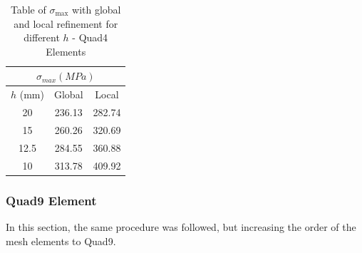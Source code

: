 \begin{table}[H]
  \centering
\caption{Table of $\sigma_{\max}$ with global and local refinement for different $h$ - Quad4 Elements}
  \begin{tabular}{|c|c|c|}
    \hline
    \multicolumn{3}{|c|}{$\sigma_{max} (MPa)$} \\ \hline
    $h$ (mm) & Global & Local \\ \hline
    20 & 236.13 & 282.74 \\ \hline
    15 & 260.26 & 320.69 \\ \hline
    12.5 & 284.55 & 360.88 \\ \hline
    10 & 313.78 & 409.92 \\ \hline
  \end{tabular}
  \label{tab:5x2}
\end{table}

\subsubsection{Quad9 Element}

In this section, the same procedure was followed, but increasing the order of the mesh elements to Quad9.


